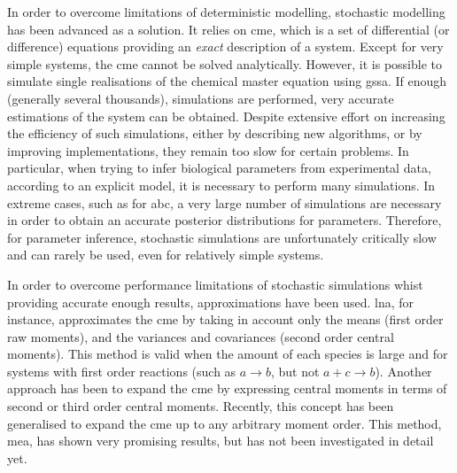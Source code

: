 In order to overcome limitations of deterministic modelling, stochastic modelling has been advanced as a solution.
It relies on \gls{cme}, which is a set of differential (or difference) equations providing an \emph{exact} description of a system\cite{kampen_stochastic_2011}.
Except for very simple systems, the \gls{cme} cannot be solved analytically.
However, it is possible to simulate single realisations of the chemical master equation using \gls{gssa}.
If enough (generally several thousands), simulations are performed, very accurate estimations of the system can be obtained.
Despite extensive effort on increasing the efficiency of such simulations, either by describing new algorithms, or by improving implementations,
they remain too slow for certain problems.
In particular, when trying to infer biological parameters from experimental data, according to an explicit model,
it is necessary to perform many simulations.
In extreme cases, such as for \gls{abc}\cite{toni_approximate_2009}, a very large number of simulations are necessary in order to obtain an 
accurate posterior distributions for parameters.
Therefore, for parameter inference, stochastic simulations are unfortunately critically slow and can rarely be used, even for relatively simple systems.

In order to overcome performance limitations of stochastic simulations whist providing accurate enough results, approximations have been used.
\Gls{lna}, for instance, approximates the \gls{cme}
by taking in account only the means (first order raw moments), and the variances and covariances (second order central moments)\cite{komorowski_bayesian_2009}.
This method is valid when the amount of each species is large and for systems with first order reactions
(such as  $a \rightarrow b$, but not $a + c  \rightarrow b$).
Another approach has been to expand the \gls{cme} by expressing central moments in terms of second or third order central moments\cite{gillespie_moment-closure_2009, gomez-uribe_mass_2007}.
Recently, this concept has been generalised to expand the \gls{cme} up to any arbitrary moment order\cite{ale_general_2013}.
This method, \gls{mea}, has shown very promising results, but has not been investigated in detail yet.

